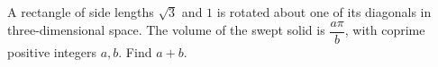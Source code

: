 A rectangle of side lengths $\sqrt3$ and $1$ is rotated about one of its diagonals in three-dimensional space. The volume of the swept solid is $\dfrac{a\pi}{b}$, with coprime positive integers $a,b$. Find $a+b$.
